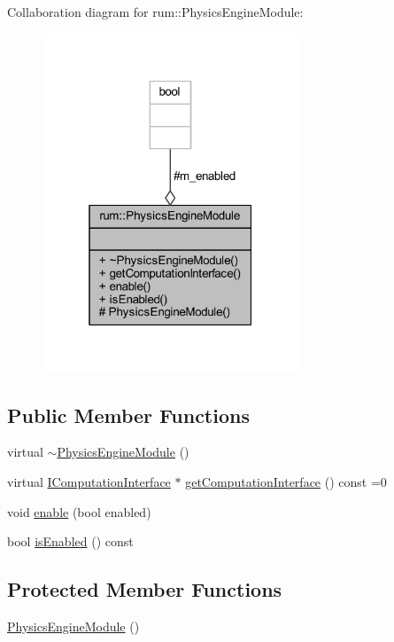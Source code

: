 Collaboration diagram for rum\+:\+:Physics\+Engine\+Module\+:\nopagebreak
\begin{figure}[H]
\begin{center}
\leavevmode
\includegraphics[width=217pt]{classrum_1_1_physics_engine_module__coll__graph}
\end{center}
\end{figure}
\subsection*{Public Member Functions}
\begin{DoxyCompactItemize}
\item 
virtual \mbox{\hyperlink{classrum_1_1_physics_engine_module_a5ca9d6dd8dc60cec6c562f5aa80ecf64}{$\sim$\+Physics\+Engine\+Module}} ()
\item 
virtual \mbox{\hyperlink{classrum_1_1_i_computation_interface}{I\+Computation\+Interface}} $\ast$ \mbox{\hyperlink{classrum_1_1_physics_engine_module_ae6046bf333d8ecebf1a2ae4eee4833c1}{get\+Computation\+Interface}} () const =0
\item 
void \mbox{\hyperlink{classrum_1_1_physics_engine_module_ae78a3d6c0ef4d2bb8c4b64d8c256b73c}{enable}} (bool enabled)
\item 
bool \mbox{\hyperlink{classrum_1_1_physics_engine_module_a7cc5a831a9579d185daf3e981b9cf5ae}{is\+Enabled}} () const
\end{DoxyCompactItemize}
\subsection*{Protected Member Functions}
\begin{DoxyCompactItemize}
\item 
\mbox{\hyperlink{classrum_1_1_physics_engine_module_ab94c27f034522f95456f7736b50b6063}{Physics\+Engine\+Module}} ()
\end{DoxyCompactItemize}
